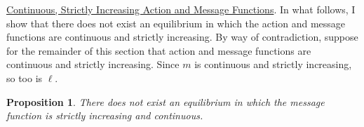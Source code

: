 \documentclass[12pt]{article}
\newtheorem{proposition}{Proposition}
\begin{document}
\noindent\underline{Continuous, Strictly Increasing Action and Message Functions}. In what follows, I show that there does not exist an equilibrium in which the action and message functions are continuous and strictly increasing. By way of contradiction, suppose for the remainder of this section that action and message functions are continuous and strictly increasing. Since $m$ is continuous and strictly increasing, so too is $\ell$. \\
\begin{proposition}
There does not exist an equilibrium in which the message function is strictly increasing and continuous.
\end{proposition}
\end{document}
